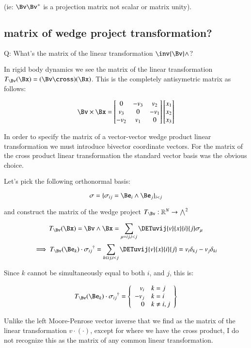 \documentclass{article}      %
\begin{document}
(ie: $\Bv \Bv^{+}$ is a projection matrix not scalar or matrix unity).

\subsection{ matrix of wedge project transformation? }

Q: What's the matrix of the linear transformation $\inv{\Bv} \wedge$?

In rigid body dynamics we see the matrix of the linear transformation $T_\Bv(\Bx) = (\Bv \cross)(\Bx)$.  This is the completely antisymetric matrix as follows:

\begin{equation}
\Bv \times \Bx = 
\begin{bmatrix}
0 & -v_3 & v_2 \\
v_3 & 0 & -v_1 \\
-v_2 & v_1 & 0 \\
\end{bmatrix}
\begin{bmatrix}
x_1 \\
x_2 \\
x_3 \\
\end{bmatrix}
\end{equation}

In order to specify the matrix of a vector-vector wedge product linear transformation we must introduce bivector coordinate vectors.  For the matrix of the cross product linear transformation the standard vector basis was the obvious choice.

Let's pick the following orthonormal basis:

\[
\sigma = \{ \sigma_{ij} = \Be_i \wedge \Be_j \}_{i<j}
\]

and construct the matrix of the wedge project $T_\Bv : \mathbb{R}^N \rightarrow {\bigwedge}^2$

\[
T_\Bv(\Bx) = \Bv \wedge \Bx = \sum_{\mu = ij, i<j} \DETuvij{v}{x}{i}{j} \sigma_{\mu}
\]
\[
\implies
T_\Bv(\Be_k) \cdot {\sigma_{ij}}^\dagger = 
\sum_{k \in ij, i<j} \DETuvij{v}{x}{i}{j} 
= %
v_i \delta_{kj} - v_j \delta_{ki}
\]

Since $k$ cannot be simultaneously equal to both $i$, and $j$, this is:

\[
T_\Bv(\Be_k) \cdot {\sigma_{ij}}^\dagger = 
\left\{
\begin{array}{rl}
v_i & k=j \\
-v_j & k=i \\
0 & k \ne i,j \\
\end{array}
\right\}
\]

Unlike the left Moore-Penrose vector inverse that we find as the matrix of the linear transformation $v \cdot ( \cdot )$, except for  where we have the cross product, I do not recognize this as the matrix of any common linear transformation.
\end{document}
